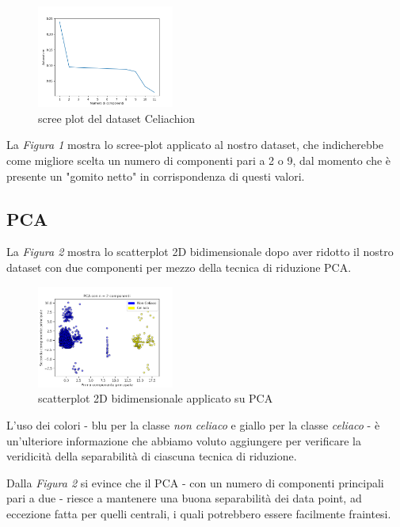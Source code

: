 \documentclass[11pt,a4paper,twocolumn]{article}
\begin{document}
	\begin{figure}[h]
		\centering
		\includegraphics[width=0.4\textwidth]{img/scree_plot.png}
		\caption{scree plot del dataset Celiachion}
	\end{figure}

	La \emph{Figura 1} mostra lo scree-plot applicato al nostro dataset, che indicherebbe come migliore scelta un numero di componenti pari a 2 o 9, dal momento che è presente un "gomito netto" in corrispondenza di questi valori.


	\subsection{PCA}

	La \emph{Figura 2} mostra lo scatterplot 2D bidimensionale dopo aver ridotto il nostro dataset con due componenti per mezzo della tecnica di riduzione PCA.

	\begin{figure}[h]
		\centering
		\includegraphics[width=0.4\textwidth]{img/PCA_2Dnc2.png}
		\caption{scatterplot 2D bidimensionale applicato su PCA}
	\end{figure}

	 L'uso dei colori - blu per la classe \emph{non celiaco} e giallo per la classe \emph{celiaco} - è un'ulteriore informazione che abbiamo voluto aggiungere per verificare la veridicità della separabilità di ciascuna tecnica di riduzione. \par
	 Dalla \emph{Figura 2} si evince che il PCA - con un numero di componenti principali pari a due - riesce a mantenere una buona separabilità dei data point, ad eccezione fatta per quelli centrali, i quali potrebbero essere facilmente fraintesi. \par
\end{document}
